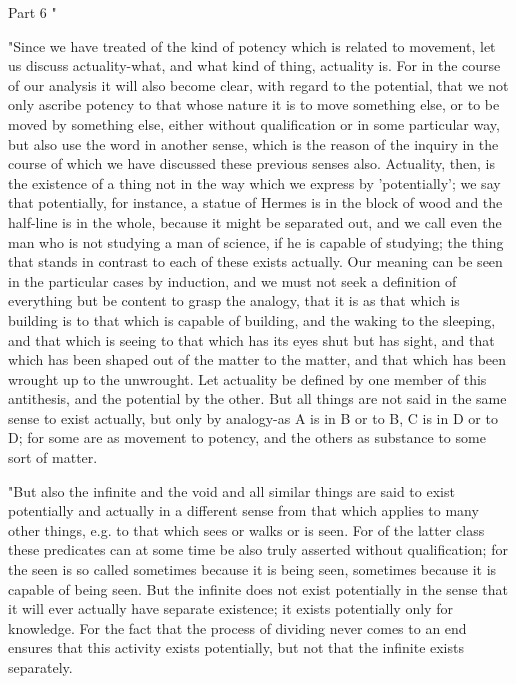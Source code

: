 Part 6 "

"Since we have treated of the kind of potency which is related to
movement, let us discuss actuality-what, and what kind of thing, actuality
is. For in the course of our analysis it will also become clear, with
regard to the potential, that we not only ascribe potency to that
whose nature it is to move something else, or to be moved by something
else, either without qualification or in some particular way, but
also use the word in another sense, which is the reason of the inquiry
in the course of which we have discussed these previous senses also.
Actuality, then, is the existence of a thing not in the way which
we express by 'potentially'; we say that potentially, for instance,
a statue of Hermes is in the block of wood and the half-line is in
the whole, because it might be separated out, and we call even the
man who is not studying a man of science, if he is capable of studying;
the thing that stands in contrast to each of these exists actually.
Our meaning can be seen in the particular cases by induction, and
we must not seek a definition of everything but be content to grasp
the analogy, that it is as that which is building is to that which
is capable of building, and the waking to the sleeping, and that which
is seeing to that which has its eyes shut but has sight, and that
which has been shaped out of the matter to the matter, and that which
has been wrought up to the unwrought. Let actuality be defined by
one member of this antithesis, and the potential by the other. But
all things are not said in the same sense to exist actually, but only
by analogy-as A is in B or to B, C is in D or to D; for some are as
movement to potency, and the others as substance to some sort of matter.

"But also the infinite and the void and all similar things are said
to exist potentially and actually in a different sense from that which
applies to many other things, e.g. to that which sees or walks or
is seen. For of the latter class these predicates can at some time
be also truly asserted without qualification; for the seen is so called
sometimes because it is being seen, sometimes because it is capable
of being seen. But the infinite does not exist potentially in the
sense that it will ever actually have separate existence; it exists
potentially only for knowledge. For the fact that the process of dividing
never comes to an end ensures that this activity exists potentially,
but not that the infinite exists separately. 

